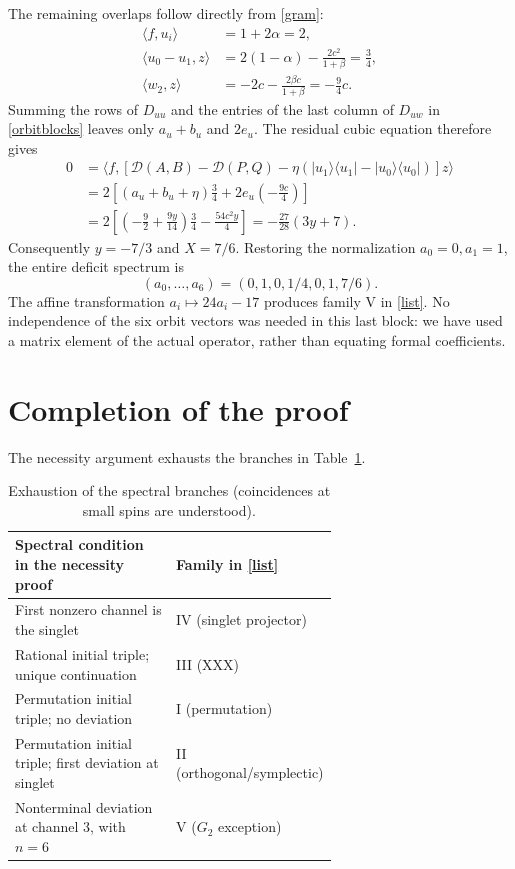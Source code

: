 \documentclass[11pt]{article}
\newcommand{\DD}{\mathcal D}
\newcommand{\pr}[1]{|#1\rangle\langle#1|}
\begin{document}
The remaining overlaps follow directly from \eqref{gram}:
\begin{align*}
 \langle f,u_i\rangle&=1+2\alpha=2,\\
 \langle u_0-u_1,z\rangle&=2(1-\alpha)-\frac{2c^2}{1+\beta}=\frac34,\\
 \langle w_2,z\rangle&=-2c-\frac{2\beta c}{1+\beta}=-\frac94c.
\end{align*}
Summing the rows of $D_{uu}$ and the entries of the last column of $D_{uw}$ in \eqref{orbitblocks} leaves only $a_u+b_u$ and $2e_u$. The residual cubic equation therefore gives
\[
\begin{aligned}
0&=\langle f,[\DD(A,B)-\DD(P,Q)-\eta(\pr{u_1}-\pr{u_0})]z\rangle\\
 &=2\left[(a_u+b_u+\eta)\frac34+2e_u\left(-\frac{9c}4\right)\right]\\
 &=2\left[\left(-\frac92+\frac{9y}{14}\right)\frac34-\frac{54c^2 y}4\right]
 =-\frac{27}{28}(3y+7).
\end{aligned}
\]
Consequently $y=-7/3$ and $X=7/6$. Restoring the normalization $a_0=0,a_1=1$, the entire deficit spectrum is
\[
 (a_0,\ldots,a_6)=(0,1,0,1/4,0,1,7/6).
\]
The affine transformation $a_i\mapsto24a_i-17$ produces family V in \eqref{list}. No independence of the six orbit vectors was needed in this last block: we have used a matrix element of the actual operator, rather than equating formal coefficients.

\section{Completion of the proof}
The necessity argument exhausts the branches in Table~\ref{branches}.

\begin{table}[H]
\centering\small
\begin{tabular}{@{}p{0.64\linewidth}l@{}}
\toprule
Spectral condition in the necessity proof & Family in \eqref{list}\\
\midrule
First nonzero channel is the singlet & IV (singlet projector)\\
Rational initial triple; unique continuation & III (XXX)\\
Permutation initial triple; no deviation & I (permutation)\\
Permutation initial triple; first deviation at singlet & II (orthogonal/symplectic)\\
Nonterminal deviation at channel 3, with $n=6$ & V ($G_2$ exception)\\
\bottomrule
\end{tabular}
\caption{Exhaustion of the spectral branches (coincidences at small spins are understood).}\label{branches}
\end{table}
\end{document}

